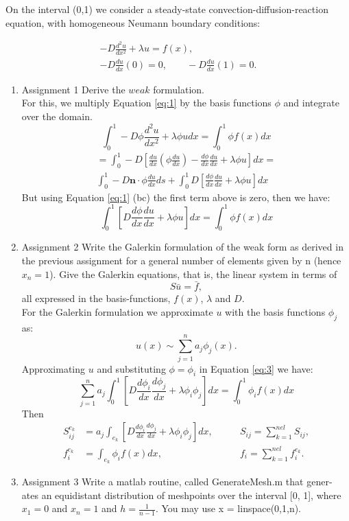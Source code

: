 \documentclass[a4paper,10pt]{report}
\title{}
\author{}
\begin{document}
On the interval (0,1) we consider a steady-state convection-diffusion-reaction equation, with homogeneous Neumann boundary conditions:

\begin{align}\label{eq:1}
 -D\frac{d^2u}{dx^2}+\lambda u= f(x), \\
 -D\frac{du}{dx}(0)=0, \qquad -D\frac{du}{dx}(1)=0.
\end{align}
\begin{enumerate}
 \item{Assignment 1} Derive the $weak$ formulation. \\
 For this, we multiply Equation \eqref{eq:1} by the basis functions $\phi$ and integrate over the domain.\\
 \begin{equation}\label{eq:2}
 \int_{0}^{1} -D\phi\frac{d^2u}{dx^2}+\lambda \phi u dx= \int_{0}^{1}\phi f(x)dx 
\end{equation}
  \begin{align*}
 =\int_{0}^{1} -D\left[\frac{du}{dx}\left(\phi\frac{du}{dx}\right)-\frac{d\phi}{dx}\frac{du}{dx}+\lambda \phi u \right]dx=\\
 \int_{0}^{1} -D\mathbf{n}\cdot \phi\frac{du}{dx} ds+\int_{0}^{1}D\left[\frac{d\phi}{dx}\frac{du}{dx}+\lambda \phi u \right]dx
\end{align*}
But using Equation \eqref{eq:1} (bc) the first term above is zero, then we have:
 \begin{equation}\label{eq:3}
\int_{0}^{1}\left[D\frac{d\phi}{dx}\frac{du}{dx}+\lambda \phi u \right]dx= \int_{0}^{1}\phi f(x)dx
\end{equation}
\item{Assignment 2} Write the Galerkin formulation of the weak form as derived
in the previous assignment for a general number of elements given by n (hence
$x_n = 1$). Give the Galerkin equations, that is, the linear system in terms of
\begin{equation}\label{eq:4}
S\bar{u} = \bar{f},
 \end{equation}
all expressed in the basis-functions, $f(x)$, $\lambda$ and $D$.\\
For the Galerkin formulation we approximate ${u}$ with the basis functions $\phi_j$ as:
$$u(x)\sim \sum_{j=1}^na_j\phi_j(x).$$
Approximating $u$ and substituting $\phi=\phi_i$ in Equation \eqref{eq:3} we have:
 \begin{equation}\label{eq:5}
\sum_{j=1}^na_j\int_{0}^{1}\left[D\frac{d\phi_i}{dx}\frac{d\phi_j}{dx}+\lambda \phi_i \phi_j \right]dx= \int_{0}^{1}\phi_i f(x)dx
\end{equation}
Then 
\begin{align*}
S_{ij}^{e_k}&=a_j\int_{e_k}\left[D\frac{d\phi_i}{dx}\frac{d\phi_j}{dx}+\lambda \phi_i \phi_j \right]dx, \qquad &S_{ij}=\sum_{k=1}^{nel}S_{ij},\\
f_i^{e_k}&=\int_{e_k}\phi_i f(x)dx, \qquad &f_i=\sum_{k=1}^{nel}f_i^{e_k}.
\end{align*}
\item{Assignment 3} Write a matlab routine, called GenerateMesh.m that gener-
ates an equidistant distribution of meshpoints over the interval [0, 1], where
$x_1 = 0$ and $x_n = 1$ and $h =\frac{1}{n−1}$. You may use x = linspace(0,1,n).


\end{enumerate}
\end{document}
